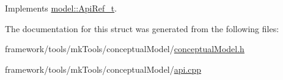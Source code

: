 Implements \hyperlink{structmodel_1_1_api_ref__t_ab5fe6d59f36125d257ec0931357038af}{model\+::\+Api\+Ref\+\_\+t}.



The documentation for this struct was generated from the following files\+:\begin{DoxyCompactItemize}
\item 
framework/tools/mk\+Tools/conceptual\+Model/\hyperlink{conceptual_model_8h}{conceptual\+Model.\+h}\item 
framework/tools/mk\+Tools/conceptual\+Model/\hyperlink{api_8cpp}{api.\+cpp}\end{DoxyCompactItemize}
